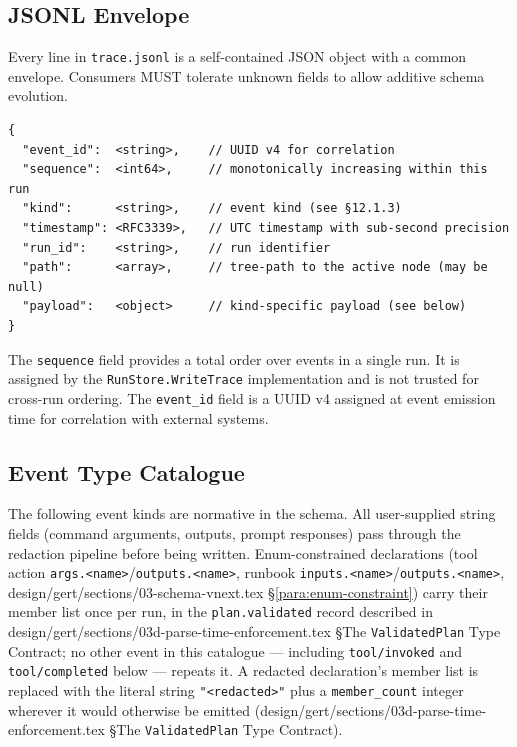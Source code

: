 \subsection{JSONL Envelope}

Every line in \texttt{trace.jsonl} is a self-contained JSON object with a common envelope. Consumers MUST tolerate unknown fields to allow additive schema evolution.

\begin{verbatim}
{
  "event_id":  <string>,    // UUID v4 for correlation
  "sequence":  <int64>,     // monotonically increasing within this run
  "kind":      <string>,    // event kind (see §12.1.3)
  "timestamp": <RFC3339>,   // UTC timestamp with sub-second precision
  "run_id":    <string>,    // run identifier
  "path":      <array>,     // tree-path to the active node (may be null)
  "payload":   <object>     // kind-specific payload (see below)
}
\end{verbatim}

The \texttt{sequence} field provides a total order over events in a single run. It is assigned by the \texttt{RunStore.WriteTrace} implementation and is not trusted for cross-run ordering. The \texttt{event\_id} field is a UUID v4 assigned at event emission time for correlation with external systems.

\subsection{Event Type Catalogue}

The following event kinds are normative in the schema. All user-supplied string fields (command arguments, outputs, prompt responses) pass through the redaction pipeline before being written. Enum-constrained declarations (tool action \texttt{args.<name>}/\texttt{outputs.<name>}, runbook \texttt{inputs.<name>}/\texttt{outputs.<name>}, design/gert/sections/03-schema-vnext.tex \S\ref{para:enum-constraint}) carry their member list once per run, in the \texttt{plan.validated} record described in design/gert/sections/03d-parse-time-enforcement.tex \S The \texttt{ValidatedPlan} Type Contract; no other event in this catalogue --- including \texttt{tool/invoked} and \texttt{tool/completed} below --- repeats it. A redacted declaration's member list is replaced with the literal string \texttt{"<redacted>"} plus a \texttt{member\_count} integer wherever it would otherwise be emitted (design/gert/sections/03d-parse-time-enforcement.tex \S The \texttt{ValidatedPlan} Type Contract).

